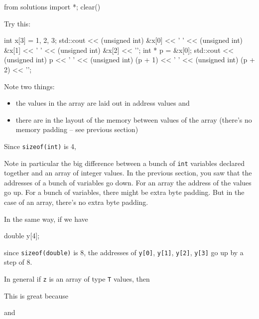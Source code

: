 \begin{python0}
from solutions import *; clear()
\end{python0}

Try this:

\begin{consolethree}[escapeinside=||]
int x[3] = {1, 2, 3};
std::cout << (unsigned int) &x[0] << ' '
          << (unsigned int) &x[1] << ' '
          << (unsigned int) &x[2] << '\n';
int * p = &x[0];
std::cout << (unsigned int) p << ' '
          << (unsigned int) (p + 1) << ' '
          << (unsigned int) (p + 2) << '\n';
\end{consolethree}

Note two things:

\begin{itemize}
\item the values in the array are laid out in  address
  values and
\item there are  in the layout of the memory between values
  of the array (there's no memory padding -- see previous section)
\end{itemize}

Since \texttt{sizeof(int)} is 4,
\begin{center}
\texttt{} \texttt{}
\end{center}

Note in particular the big difference between a bunch of \texttt{int} variables declared together and an array of integer values. In the previous section, you saw that the addresses of a bunch of variables go down. For an array the address of the values go up. For a bunch of variables, there might be extra byte padding. But in the case of an array, there's no extra byte padding.

In the same way, if we have

\begin{consolethree}[escapeinside=||]
double y[4];
\end{consolethree}

since \texttt{sizeof(double)} is 8, the addresses of \texttt{y[0]}, \texttt{y[1]}, \texttt{y[2]}, \texttt{y[3]} go up by a step of 8.

In general if \texttt{z} is an array of type \texttt{T} values, then
\begin{center}
\end{center}
This is great because
\begin{center}
\end{center}
and
\begin{center}
\end{center}

